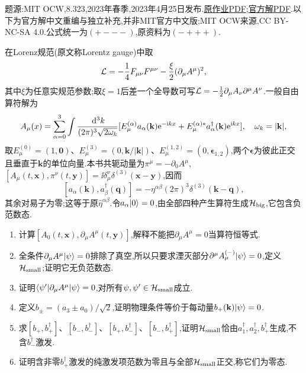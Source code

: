题源:MIT OCW,8.323,2023年春季,2023年4月25日发布.\href{https://ocw.mit.edu/courses/8-323-relativistic-quantum-field-theory-i-spring-2023/mit8_323_s23_pset11.pdf}{原作业PDF};\href{https://ocw.mit.edu/courses/8-323-relativistic-quantum-field-theory-i-spring-2023/mit8_323_s23_pset_11sol.pdf}{官方解PDF}.以下为官方解中文重编与独立补充,并非MIT官方中文版;MIT OCW来源,CC BY-NC-SA 4.0.公式统一为$(+---)$,原资料为$(-+++)$.

\begin{exercise}
在Lorenz规范(原文称Lorentz gauge)中取
\[
 \mathcal L=-\frac14F_{\mu\nu}F^{\mu\nu}-\frac\xi2(\partial_\mu A^\mu)^2,
\]
其中$\xi$为任意实规范参数;取$\xi=1$后差一个全导数可写$\mathcal L=-\frac12\partial_\mu A_\nu\partial^\mu A^\nu$.一般自由算符解为
\[
 A_\mu(x)=\sum_{\alpha=0}^3\int\frac{\,\mathrm d^3k}{(2\pi)^3\sqrt{2\omega_k}}
 [E_\mu^{(\alpha)}a_\alpha(\mathbf k)\mathrm e^{-\mathrm i kx}
 +E_\mu^{(\alpha)*}a_\alpha^\dagger(\mathbf k)\mathrm e^{\mathrm i kx}],\quad\omega_k=|\mathbf k|,
\]
取$E_\mu^{(0)}=(1,\mathbf0)$、$E_\mu^{(3)}=(0,\mathbf k/|\mathbf k|)$、$E_\mu^{(1,2)}=(0,\boldsymbol\epsilon_{1,2})$,两个$\boldsymbol\epsilon$为彼此正交且垂直于$\mathbf k$的单位向量.本书共轭动量为$\pi^\mu=-\partial_0A^\mu$,$[A_\mu(t,\mathbf x),\pi^\nu(t,\mathbf y)]=\ii\delta_\mu^\nu\delta^{(3)}(\mathbf x-\mathbf y)$,因而
\[
 [a_\alpha(\mathbf k),a_\beta^\dagger(\mathbf q)]
 =-\eta^{\alpha\beta}(2\pi)^3\delta^{(3)}(\mathbf k-\mathbf q),
\]
其余对易子为零;这等于原$\widehat\eta^{\alpha\beta}$.令$a_\alpha\lvert 0\rangle=0$,由全部四种产生算符生成$\mathcal H_{\rm big}$,它包含负范数态.
\begin{enumerate}[label=(\alph*)]
\item 计算$[A_0(t,\mathbf x),\partial_\mu A^\mu(t,\mathbf y)]$,解释不能把$\partial_\mu A^\mu=0$当算符恒等式.
\item 全条件$\partial_\mu A^\mu\lvert \psi\rangle=0$排除了真空,所以只要求湮灭部分$\partial^\mu A_\mu^{(-)}\lvert \psi\rangle=0$,定义$\mathcal H_{\rm small}$;证明它无负范数态.
\item 证明$\langle \psi'\rvert\partial_\mu A^\mu\lvert \psi\rangle=0$,对所有$\psi,\psi'\in\mathcal H_{\rm small}$成立.
\item 定义$b_\pm=(a_3\pm a_0)/\sqrt2$,证明物理条件等价于每动量$b_+(\mathbf k)\lvert \psi\rangle=0$.
\item 求$[b_+,b_+^\dagger]$、$[b_-,b_-^\dagger]$、$[b_+,b_-^\dagger]$、$[b_-,b_+^\dagger]$,证明$\mathcal H_{\rm small}$恰由$a_1^\dagger,a_2^\dagger,b_+^\dagger$生成,不含$b_-^\dagger$激发.
\item 证明含非零$b_+^\dagger$激发的纯激发项范数为零且与全部$\mathcal H_{\rm small}$正交,称它们为零态.

\end{enumerate}
\end{exercise}
